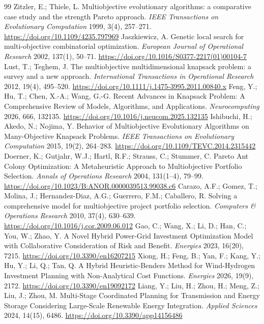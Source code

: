 \documentclass[applsci,article,submit,moreauthors]{Definitions/mdpi}
\begin{document}
\begin{thebibliography}{99}
 Zitzler, E.; Thiele, L. Multiobjective evolutionary algorithms: a comparative case study and the strength Pareto approach. \emph{IEEE Transactions on Evolutionary Computation} 1999, 3(4), 257--271. \url{https://doi.org/10.1109/4235.797969}
 Jaszkiewicz, A. Genetic local search for multi-objective combinatorial optimization. \emph{European Journal of Operational Research} 2002, 137(1), 50--71. \url{https://doi.org/10.1016/S0377-2217(01)00104-7}
 Lust, T.; Teghem, J. The multiobjective multidimensional knapsack problem: a survey and a new approach. \emph{International Transactions in Operational Research} 2012, 19(4), 495--520. \url{https://doi.org/10.1111/j.1475-3995.2011.00840.x}
 Feng, Y.; Hu, T.; Chen, X.-A.; Wang, G.-G. Recent Advances in Knapsack Problem: A Comprehensive Review of Models, Algorithms, and Applications. \emph{Neurocomputing} 2026, 666, 132135. \url{https://doi.org/10.1016/j.neucom.2025.132135}
 Ishibuchi, H.; Akedo, N.; Nojima, Y. Behavior of Multiobjective Evolutionary Algorithms on Many-Objective Knapsack Problems. \emph{IEEE Transactions on Evolutionary Computation} 2015, 19(2), 264--283. \url{https://doi.org/10.1109/TEVC.2014.2315442}
 Doerner, K.; Gutjahr, W.J.; Hartl, R.F.; Strauss, C.; Stummer, C. Pareto Ant Colony Optimization: A Metaheuristic Approach to Multiobjective Portfolio Selection. \emph{Annals of Operations Research} 2004, 131(1--4), 79--99. \url{https://doi.org/10.1023/B:ANOR.0000039513.99038.c6}
 Carazo, A.F.; Gomez, T.; Molina, J.; Hernandez-Diaz, A.G.; Guerrero, F.M.; Caballero, R. Solving a comprehensive model for multiobjective project portfolio selection. \emph{Computers \& Operations Research} 2010, 37(4), 630--639. \url{https://doi.org/10.1016/j.cor.2009.06.012}
 Gao, C.; Wang, X.; Li, D.; Han, C.; You, W.; Zhao, Y. A Novel Hybrid Power-Grid Investment Optimization Model with Collaborative Consideration of Risk and Benefit. \emph{Energies} 2023, 16(20), 7215. \url{https://doi.org/10.3390/en16207215}
 Xiong, H.; Feng, B.; Yan, F.; Kang, Y.; Hu, Y.; Li, Q.; Tan, Q. A Hybrid Heuristic-Benders Method for Wind-Hydrogen Investment Planning with Non-Analytical Cost Functions. \emph{Energies} 2026, 19(9), 2172. \url{https://doi.org/10.3390/en19092172}
 Liang, Y.; Liu, H.; Zhou, H.; Meng, Z.; Liu, J.; Zhou, M. Multi-Stage Coordinated Planning for Transmission and Energy Storage Considering Large-Scale Renewable Energy Integration. \emph{Applied Sciences} 2024, 14(15), 6486. \url{https://doi.org/10.3390/app14156486}

\end{thebibliography}
\end{document}
